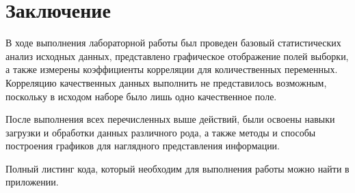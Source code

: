 \chapter{Заключение}
В ходе выполнения лабораторной работы был проведен базовый статистических анализ исходных данных, представлено графическое отображение полей выборки, а также измерены коэффициенты корреляции для количественных переменных. Корреляцию качественных данных выполнить не представилось возможным, поскольку в исходом наборе было лишь одно качественное поле.

После выполнения всех перечисленных выше действий, были освоены навыки загрузки и обработки данных различного рода, а также методы и способы построения графиков для наглядного представления информации.

Полный листинг кода, который необходим для выполнения работы можно найти в приложении.